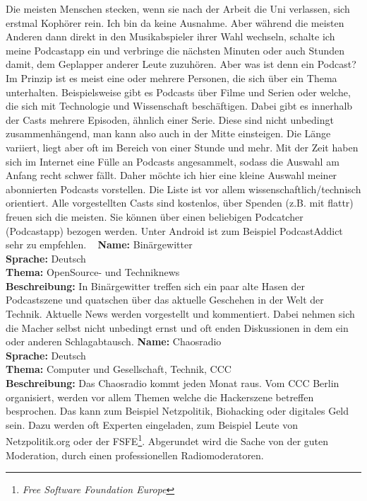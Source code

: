 {Die meisten Menschen stecken, wenn sie nach der Arbeit die Uni verlassen, sich erstmal Kophörer rein. Ich bin da keine Ausnahme. Aber während die meisten Anderen dann direkt in den
    Musikabspieler ihrer Wahl wechseln, schalte ich meine Podcastapp ein und verbringe die nächsten Minuten oder auch Stunden damit, dem Geplapper anderer Leute zuzuhören.
    Aber was ist denn ein Podcast? Im Prinzip ist es meist eine oder mehrere Personen, die sich über ein Thema unterhalten. Beispielsweise gibt es Podcasts über Filme und Serien oder welche, die sich mit Technologie und Wissenschaft beschäftigen. Dabei gibt es innerhalb der Casts mehrere Episoden, ähnlich einer Serie. Diese sind nicht unbedingt zusammenhängend, man kann also auch in der Mitte einsteigen. Die Länge variiert, liegt aber oft im Bereich von einer Stunde und mehr.
    Mit der Zeit haben sich im Internet eine Fülle an Podcasts angesammelt, sodass die Auswahl am Anfang recht schwer fällt. Daher möchte ich hier eine kleine Auswahl meiner abonnierten Podcasts vorstellen. Die Liste ist vor allem wissenschaftlich/technisch orientiert. Alle vorgestellten Casts sind kostenlos, über Spenden (z.B. mit flattr)
    freuen sich die meisten. Sie können über einen beliebigen Podcatcher (Podcastapp) bezogen werden. Unter Android ist zum Beispiel PodcastAddict sehr zu empfehlen.
    \vfill\columnbreak
    ~\vfill
    \textbf{Name: }Binärgewitter\\
    \textbf{Sprache: }Deutsch\\
    \textbf{Thema: }OpenSource- und Techniknews\\
    \textbf{Beschreibung: }In Binärgewitter treffen sich ein paar alte Hasen der Podcastszene und quatschen über das aktuelle Geschehen in der Welt der Technik.
    Aktuelle News werden vorgestellt und kommentiert. Dabei nehmen sich die Macher selbst nicht unbedingt ernst und oft enden Diskussionen in dem ein oder anderen
    Schlagabtausch.
    \vfill\vfill
    \textbf{Name: }Chaosradio\\
    \textbf{Sprache: }Deutsch\\
    \textbf{Thema: }Computer und Gesellschaft, Technik, CCC\\
    \textbf{Beschreibung: }Das Chaosradio kommt jeden Monat raus. Vom CCC Berlin organisiert, werden vor allem Themen welche die Hackerszene betreffen besprochen. Das kann zum Beispiel Netzpolitik, Biohacking oder digitales Geld sein. Dazu werden oft Experten eingeladen, zum Beispiel Leute von Netzpolitik.org oder der FSFE\footnote{\textit{Free Software Foundation Europe}}. Abgerundet wird die Sache von der guten Moderation, durch einen professionellen Radiomoderatoren.
}
